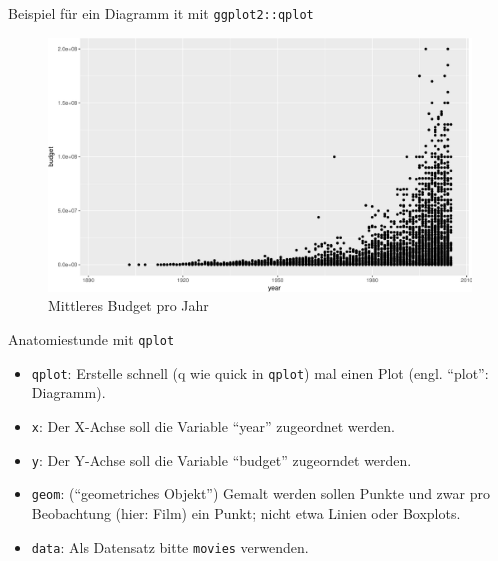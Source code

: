 \begin{frame}[fragile]{Beispiel für ein Diagramm it mit
\texttt{ggplot2::qplot}}

\begin{Shaded}
\begin{Highlighting}[]
\NormalTok{(} \NormalTok{, }
\end{Highlighting}
\end{Shaded}

\begin{figure}

{\centering \includegraphics[width=0.5\linewidth]{PraDa_Folien_nm_2_files/figure-beamer/fig-movies-1} 

}

\caption{Mittleres Budget pro Jahr}\label{fig:fig-movies}
\end{figure}

\end{frame}

\begin{frame}[fragile]{Anatomiestunde mit \texttt{qplot}}

\begin{itemize}
\tightlist
\item
  \texttt{qplot}: Erstelle schnell (q wie quick in \texttt{qplot}) mal
  einen Plot (engl. ``plot'': Diagramm).\\
\item
  \texttt{x}: Der X-Achse soll die Variable ``year'' zugeordnet
  werden.\\
\item
  \texttt{y}: Der Y-Achse soll die Variable ``budget'' zugeorndet
  werden.\\
\item
  \texttt{geom}: (``geometriches Objekt'') Gemalt werden sollen Punkte
  und zwar pro Beobachtung (hier: Film) ein Punkt; nicht etwa Linien
  oder Boxplots.
\item
  \texttt{data}: Als Datensatz bitte \texttt{movies} verwenden.
\end{itemize}

\end{frame}

